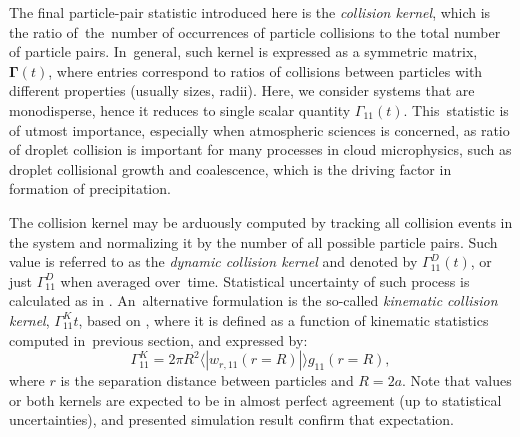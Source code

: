 \documentclass{pracamgren}
\begin{document}
The final particle-pair statistic introduced here is the \emph{collision kernel}, which is the ratio of~the~number of occurrences of particle collisions to the total number of particle pairs.
In~general, such kernel is expressed as a symmetric matrix, $\mathbf{\Gamma}(t)$, where entries correspond to ratios of collisions between particles with different properties (usually sizes, radii).
Here, we consider systems that are monodisperse, hence it reduces to single scalar quantity $\Gamma_{11}(t)$.
This~statistic is of utmost importance, especially when atmospheric sciences is concerned, as ratio of droplet collision is important for many processes in cloud microphysics, such as droplet collisional growth and coalescence, which is the driving factor in formation of precipitation.   

The collision kernel may be arduously computed by tracking all collision events in the system and normalizing it by the number of all possible particle pairs.
Such value is referred to as the \emph{dynamic collision kernel} and denoted by $\Gamma^D_{11}(t)$, or just $\Gamma^D_{11}$ when averaged over~time.
Statistical uncertainty of such process is calculated as in \textcite[Equation 17]{Rosa2013}.
An~alternative formulation is the so-called \emph{kinematic collision kernel}, $\Gamma^K_{11}{t}$, based on \textcite{Sundaram1997}, where it is defined as a function of kinematic statistics computed in~previous section, and expressed by:
\begin{equation}
\Gamma^K_{11} = 2 \pi R^{2} \langle | w_{r, 11}(r = R) | \rangle g_{11}(r = R),
\label{eqn:gamma-k}
\end{equation}
where $r$ is the separation distance between particles and $R = 2a$.
Note that values or both kernels are expected to be in almost perfect agreement (up to statistical uncertainties), and presented simulation result confirm that expectation.
\end{document}
